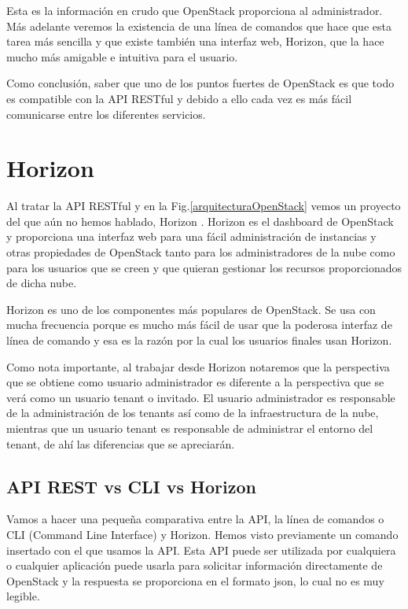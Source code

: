 Esta es la información en crudo que OpenStack proporciona al administrador. Más adelante veremos la existencia de una línea de comandos que hace que esta tarea más sencilla y que existe también una interfaz web,  Horizon, que la hace mucho más amigable e intuitiva para el usuario.

Como conclusión, saber que uno de los puntos fuertes de OpenStack es que todo es compatible con la API RESTful y debido a ello cada vez es más fácil comunicarse entre los diferentes servicios.

\section{Horizon}
Al tratar la API RESTful y en la Fig.\ref{arquitecturaOpenStack} vemos un proyecto del que aún no hemos hablado, Horizon \cite{noauthor_horizon_nodate}. Horizon es el dashboard de OpenStack y proporciona una interfaz web para una fácil administración de instancias y otras propiedades de OpenStack tanto para los administradores de la nube como para los usuarios que se creen y que quieran gestionar los recursos proporcionados de dicha nube.

Horizon es uno de los componentes más populares de OpenStack. Se usa con mucha frecuencia porque es mucho más fácil de usar que la poderosa interfaz de línea de comando y esa es la razón por la cual los usuarios finales usan Horizon.

Como nota importante, al trabajar desde Horizon notaremos que la perspectiva que se obtiene como usuario administrador es diferente a la perspectiva que se verá como un usuario tenant o invitado.
El usuario administrador es responsable de la administración de los tenants así como de la infraestructura de la nube, mientras que un usuario tenant es responsable de administrar el entorno del tenant, de ahí las diferencias que se apreciarán.

\subsection{API REST vs CLI vs Horizon}
Vamos a hacer una pequeña comparativa entre la API, la línea de comandos o CLI (Command Line Interface) y Horizon. Hemos visto previamente un comando insertado con el que usamos la API. Esta API puede ser utilizada por cualquiera o cualquier aplicación puede usarla para solicitar información directamente de OpenStack y la respuesta se proporciona en el formato json, lo cual no es muy legible.

